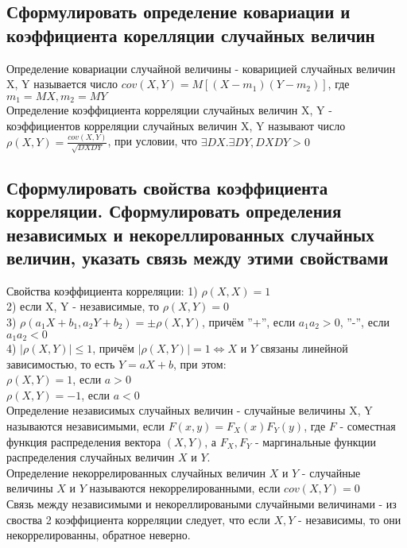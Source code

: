 \subsection{Сформулировать определение ковариации и коэффициента корелляции случайных величин}
Определение ковариации случайной величины - коварицией случайных величин X, Y называется число $cov(X, Y) = M[(X - m_{1})(Y - m_{2})]$, где $m_{1} = MX, m_{2} = MY$\\

Определение коэффициента корреляции случайных величин X, Y - коэффициентов корреляции случайных величин X, Y называют число $\rho(X, Y) = \frac{cov(X, Y)}{\sqrt{DX DY}}$, при условии, что $\exists DX. \exists DY, DX DY > 0$\\

\subsection{Сформулировать свойства коэффициента корреляции. Сформулировать определения независимых и некореллированных случайных величин, указать связь между этими свойствами}
Свойства коэффициента корреляции:
1) $\rho(X, X) = 1$\\
2) если X, Y - независимые, то $\rho(X, Y) = 0$\\
3) $\rho (a_{1}X + b_{1}, a_{2}Y + b_{2}) = \pm \rho(X, Y)$, причём ''+'', если $a_{1} a_{2} > 0$, ''-'', если $a_{1} a_{2} < 0$\\
4) $|\rho(X, Y)| \leqslant 1$, причём $|\rho(X, Y)| = 1 \Leftrightarrow X$ и $Y$ связаны линейной зависимостью, то есть $Y = aX + b$, при этом:\\
$\rho(X, Y) = 1$, если $a > 0$\\
$\rho(X, Y) = -1$, если $a < 0$\\

Определение независимых случайных величин - случайные величины X, Y называются независимыми, если $F(x, y) = F_{X}(x)F_{Y}(y)$, где $F$ - соместная функция распределения вектора $(X, Y)$, а $F_{X}, F_{Y}$ - маргинальные функции распределения случайных величин $X$ и $Y$.\\

Определение некоррелированных случайных величин $X$ и $Y$ - случайные величины $X$ и $Y$ называются некоррелированными, если $cov(X, Y) = 0$\\

Связь между независимыми и некореллироваными случайными величинами - из своства 2 коэффициента корреляции следует, что если $X, Y$ - независимы, то они некоррелированны, обратное неверно.

